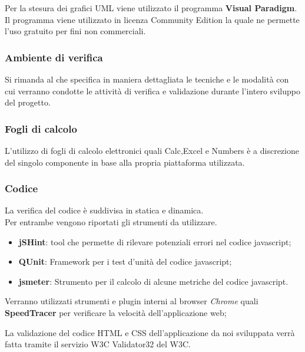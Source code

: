 Per la stesura dei grafici UML viene utilizzato il programma \textbf{Visual Paradigm}. Il programma viene utilizzato in licenza Community Edition la quale ne permette l’uso gratuito per fini non commerciali.



\subsubsection{Ambiente di verifica}

Si rimanda al \href{run:../../Esterni/Piano di qualifica/\PianoQual}{\PianoQualEscape} che specifica in maniera dettagliata
le tecniche e le modalità con cui verranno condotte le attività di verifica e validazione durante l’intero sviluppo del progetto.

\subsubsection{Fogli di calcolo}
L'utilizzo di fogli di calcolo elettronici quali Calc,Excel e Numbers è a discrezione del singolo componente in base alla propria piattaforma utilizzata.


\subsubsection{Codice} 

La verifica del codice \`{e} suddivisa in statica e dinamica.\\ 
Per entrambe vengono riportati gli strumenti da utilizzare. 


  \begin{itemize}
  \item \textbf{jSHint}: tool che permette di rilevare potenziali errori nel codice javascript;
  \item \textbf{QUnit}: Framework per i test d'unit\`{a} del codice javascript;
  \item \textbf{jsmeter}: Strumento per il calcolo di alcune metriche del codice javascript.
  \end{itemize}

Verranno utilizzati strumenti e plugin interni al browser \emph{Chrome} quali \textbf{SpeedTracer} per verificare la velocità dell'applicazione web;



La validazione del codice HTML e CSS dell’applicazione da noi sviluppata verr\`{a}
fatta tramite il servizio W3C Validator32 del W3C.


